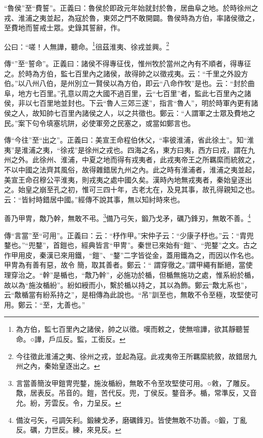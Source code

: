 {\noindent\shu{}\fzkt “魯侯”至“費誓”。正義曰：魯侯於即政元年始就封於魯，居曲阜之地。於時徐州之戎、淮浦之夷並起，為寇於魯，東郊之門不敢開闢。魯侯時為方伯，率諸侯徵之，至費地而誓戒士眾。史錄其誓辭，作。 \par}

公曰：“嗟！人無譁，聽命。\footnote{為方伯，監七百里內之諸侯，帥之以徵。嘆而敕之，使無喧譁，欲其靜聽誓命。○譁，戶瓜反。監，工銜反。}徂茲淮夷、徐戎並興。\footnote{今往徵此淮浦之夷、徐州之戎，並起為寇。此戎夷帝王所羈縻統敘，故錯居九州之內，秦始皇逐出之。}


{\noindent\zhuan{}\fzbyks 傳“”至“誓命”。正義曰：諸侯不得專征伐，惟州牧於當州之內有不順者，得專征之。於時為方伯，監七百里內之諸侯，故得帥之以徵戎夷。云：“千里之外設方伯。”以八州八伯，是州別立一賢侯以為方伯，即云“八命作牧”是也。云：“封於曲阜，地方七百里。”孔意以周之大國不過百里，云“七百里”者，監此七百里內之諸侯，非以七百里地並封也。下云“魯人三郊三遂”，指言“魯人”，明於時軍內更有諸侯之人，故知帥七百里內諸侯之人，以之共徵也。鄭云：“人謂軍之士眾及費地之民。”案下句令填塞坑阱，必使軍旁之民塞之，或當如鄭言也。 \par}

{\noindent\zhuan{}\fzbyks 傳“今往”至“出之”。正義曰：美宣王命程伯休父，“率彼淮浦，省此徐土”。知“淮夷”是淮浦之夷，“徐戎”是徐州之戎也。四海之名，東方曰夷，西方曰戎，謂在九州之外。此徐州、淮浦，中夏之地而得有戎夷者，此戎夷帝王之所羈縻而統敘之，不以中國之法齊其風俗，故得雜錯居九州之內。此之時有淮浦者，淮浦之夷並起，美宣王命召穆公平淮夷，則戎夷之處中國久矣。漢時內地無戎夷者，秦始皇逐出之。始皇之崩至孔之初，惟可三四十年，古老尢在，及見其事，故孔得親知之也。云：“皆紂時錯居中國。”經傳不說其事，無以知紂時來也。 \par}

善乃甲冑，敿乃幹，無敢不弔。\footnote{言當善簡汝甲鎧冑兜鍪，施汝楯紛，無敢不令至攻堅使可用。○敹，了雕反。敿，居表反。吊音的。鎧，苦代反。兜，丁侯反。鍪音矛。楯，常準反，又音允。紛，芳雲反。令，力呈反。}備乃弓矢，鍛乃戈矛，礪乃鋒刃，無敢不善。\footnote{備汝弓矢，弓調矢利。鍛練戈矛，磨礪鋒刃。皆使無敢不功善。○鍛，丁亂反。礪，力世反。練，來見反。}

{\noindent\zhuan{}\fzbyks 傳“言當”至“可用”。正義曰：云：“杼作甲。”宋仲子云：“少康子杼也。”云：“胄兜鍪也。”“兜鍪”，首鎧也，經典皆言“甲冑”。秦世已來始有“鎧”、“兜鍪”之文。古之作甲用皮，秦漢已來用鐵，“鎧”、“鍪”二字皆從金，蓋用鐵為之，而因以作名也。甲冑為有善有惡，故令 簡，取其善者。鄭云：“ 謂穿徹之。”謂甲繩有斷絕，當使 理穿治之。“幹”是楯也，“敿乃幹”，必施功於楯，但楯無施功之處，惟系紛於楯，故以為“施汝楯紛”。紛如綬而小，繫於楯以持之，其以為飾。鄭云“敿尢系也”，云“敿楯當有紛系持之”，是相傳為此說也。“吊”訓至也，無敢不令至極，攻堅使可用。鄭云：“至，尢善也。” \par}

